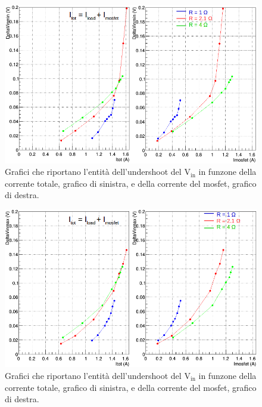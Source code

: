 \begin{figure}
\centering
\includegraphics[scale=.45]{Immagini/VinUnd}
\caption{Grafici che riportano l'entità dell'undershoot del $\mathrm{V_{in}}$ in funzone della corrente totale, grafico di sinistra, e della corrente del mosfet, grafico di destra.}
\label{VinUnd}
\end{figure}
\begin{figure}
\centering
\includegraphics[scale=.45]{Immagini/VinOver}
\caption{Grafici che riportano l'entità dell'undershoot del $\mathrm{V_{in}}$ in funzone della corrente totale, grafico di sinistra, e della corrente del mosfet, grafico di destra.}
\label{VinOver}
\end{figure}

